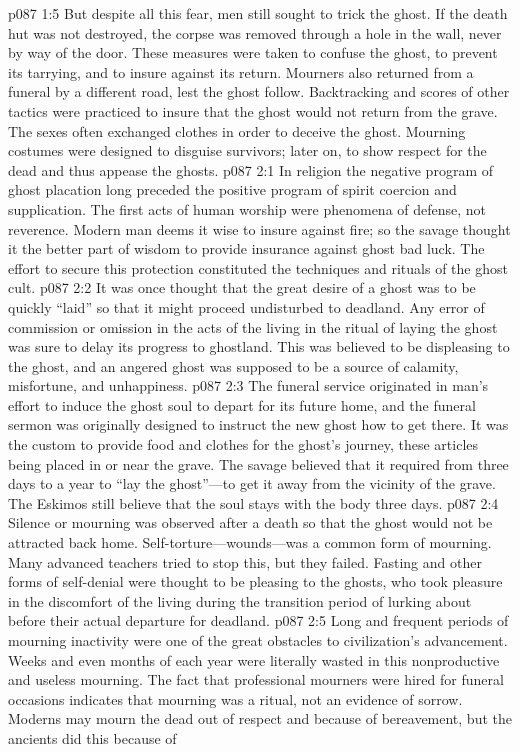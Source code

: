 \vs p087 1:5 But despite all this fear, men still sought to trick the ghost. If the death hut was not destroyed, the corpse was removed through a hole in the wall, never by way of the door. These measures were taken to confuse the ghost, to prevent its tarrying, and to insure against its return. Mourners also returned from a funeral by a different road, lest the ghost follow. Backtracking and scores of other tactics were practiced to insure that the ghost would not return from the grave. The sexes often exchanged clothes in order to deceive the ghost. Mourning costumes were designed to disguise survivors; later on, to show respect for the dead and thus appease the ghosts.\plusone
{}
\vs p087 2:1 In religion the negative program of ghost placation long preceded the positive program of spirit coercion and supplication. The first acts of human worship were phenomena of defense, not reverence. Modern man deems it wise to insure against fire; so the savage thought it the better part of wisdom to provide insurance against ghost bad luck. The effort to secure this protection constituted the techniques and rituals of the ghost cult.
\pc \vs p087 2:2 It was once thought that the great desire of a ghost was to be quickly “laid” so that it might proceed undisturbed to deadland. Any error of commission or omission in the acts of the living in the ritual of laying the ghost was sure to delay its progress to ghostland. This was believed to be displeasing to the ghost, and an angered ghost was supposed to be a source of calamity, misfortune, and unhappiness.
\vs p087 2:3 The funeral service originated in man’s effort to induce the ghost soul to depart for its future home, and the funeral sermon was originally designed to instruct the new ghost how to get there. It was the custom to provide food and clothes for the ghost’s journey, these articles being placed in or near the grave. The savage believed that it required from three days to a year to “lay the ghost”---to get it away from the vicinity of the grave. The Eskimos still believe that the soul stays with the body three days.
\vs p087 2:4 Silence or mourning was observed after a death so that the ghost would not be attracted back home. Self\hyp{}torture---wounds---was a common form of mourning. Many advanced teachers tried to stop this, but they failed. Fasting and other forms of self\hyp{}denial were thought to be pleasing to the ghosts, who took pleasure in the discomfort of the living during the transition period of lurking about before their actual departure for deadland.
\vs p087 2:5 Long and frequent periods of mourning inactivity were one of the great obstacles to civilization’s advancement. Weeks and even months of each year were literally wasted in this nonproductive and useless mourning. The fact that professional mourners were hired for funeral occasions indicates that mourning was a ritual, not an evidence of sorrow. Moderns may mourn the dead out of respect and because of bereavement, but the ancients did this because of 
